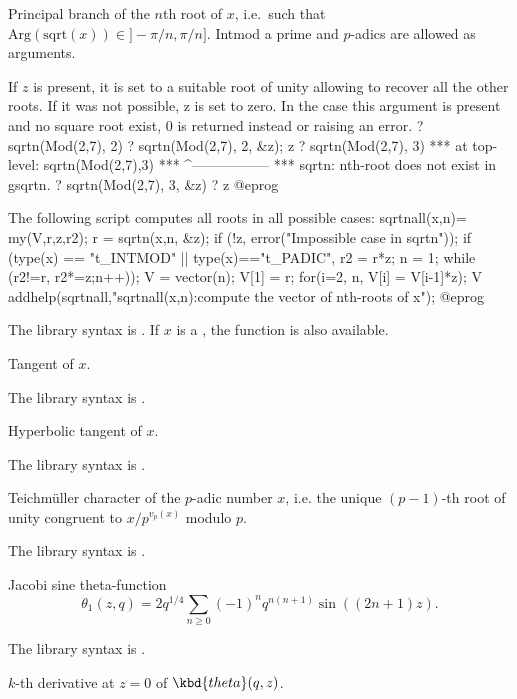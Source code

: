 \label{se:sqrtn}
Principal branch of the $n$th root of $x$,
i.e.~such that $\text{Arg}(\text{sqrt}(x))\in{} ]-\pi/n, \pi/n]$. Intmod
a prime and $p$-adics are allowed as arguments.

If $z$ is present, it is set to a suitable root of unity allowing to
recover all the other roots. If it was not possible, z is
set to zero. In the case this argument is present and no square root exist,
$0$ is returned instead or raising an error.
\bprog
? sqrtn(Mod(2,7), 2)
? sqrtn(Mod(2,7), 2, &z); z
? sqrtn(Mod(2,7), 3)
  ***   at top-level: sqrtn(Mod(2,7),3)
  ***                 ^-----------------
  *** sqrtn: nth-root does not exist in gsqrtn.
? sqrtn(Mod(2,7), 3,  &z)
? z
@eprog

The following script computes all roots in all possible cases:
\bprog
sqrtnall(x,n)=
{ my(V,r,z,r2);
  r = sqrtn(x,n, &z);
  if (!z, error("Impossible case in sqrtn"));
  if (type(x) == "t_INTMOD" || type(x)=="t_PADIC",
    r2 = r*z; n = 1;
    while (r2!=r, r2*=z;n++));
  V = vector(n); V[1] = r;
  for(i=2, n, V[i] = V[i-1]*z);
  V
}
addhelp(sqrtnall,"sqrtnall(x,n):compute the vector of nth-roots of x");
@eprog\noindent

The library syntax is .
If $x$ is a , the function
 is also available.

\label{se:tan}
Tangent of $x$.

The library syntax is .

\label{se:tanh}
Hyperbolic tangent of $x$.

The library syntax is .

\label{se:teichmuller}
Teichm\"uller character of the $p$-adic number $x$, i.e. the unique
$(p-1)$-th root of unity congruent to $x / p^{v_p(x)}$ modulo $p$.

The library syntax is .

\label{se:theta}
Jacobi sine theta-function
$$ \theta_1(z, q) = 2q^{1/4} \sum_{n\geq 0} (-1)^n q^{n(n+1)} \sin((2n+1)z).$$

The library syntax is .

\label{se:thetanullk}
$k$-th derivative at $z=0$ of $\kbd{theta}(q,z)$.

